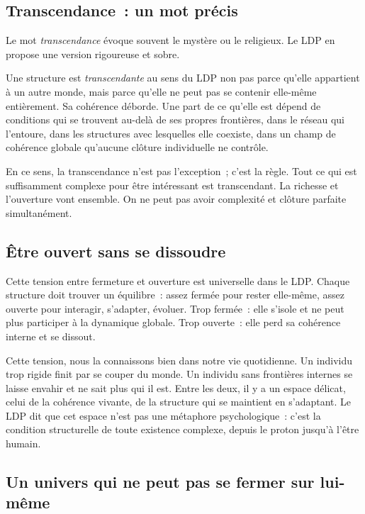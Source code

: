 \documentclass[12pt, a4paper, openright]{book}
\begin{document}
\subsection*{Transcendance~: un mot précis}

Le mot \emph{transcendance} évoque souvent le mystère ou le religieux. Le LDP en propose une version rigoureuse et sobre.

\medskip

Une structure est \emph{transcendante} au sens du LDP non pas parce qu'elle appartient à un autre monde, mais parce qu'elle ne peut pas se contenir elle-même entièrement. Sa cohérence déborde. Une part de ce qu'elle est dépend de conditions qui se trouvent au-delà de ses propres frontières, dans le réseau qui l'entoure, dans les structures avec lesquelles elle coexiste, dans un champ de cohérence globale qu'aucune clôture individuelle ne contrôle.

\medskip

En ce sens, la transcendance n'est pas l'exception~; c'est la règle. Tout ce qui est suffisamment complexe pour être intéressant est transcendant. La richesse et l'ouverture vont ensemble. On ne peut pas avoir complexité et clôture parfaite simultanément.

\subsection*{Être ouvert sans se dissoudre}

Cette tension entre fermeture et ouverture est universelle dans le LDP. Chaque structure doit trouver un équilibre~: assez fermée pour rester elle-même, assez ouverte pour interagir, s'adapter, évoluer. Trop fermée~: elle s'isole et ne peut plus participer à la dynamique globale. Trop ouverte~: elle perd sa cohérence interne et se dissout.

\medskip

Cette tension, nous la connaissons bien dans notre vie quotidienne. Un individu trop rigide finit par se couper du monde. Un individu sans frontières internes se laisse envahir et ne sait plus qui il est. Entre les deux, il y a un espace délicat, celui de la cohérence vivante, de la structure qui se maintient en s'adaptant. Le LDP dit que cet espace n'est pas une métaphore psychologique~: c'est la condition structurelle de toute existence complexe, depuis le proton jusqu'à l'être humain.

\subsection*{Un univers qui ne peut pas se fermer sur lui-même}
\end{document}
